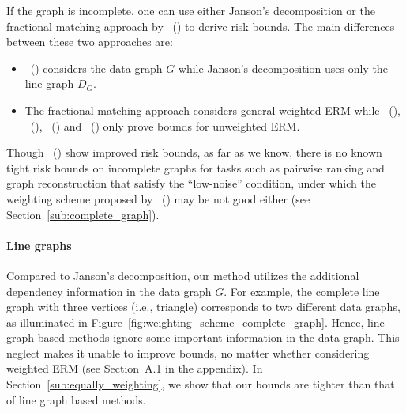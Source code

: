 \documentclass[letterpaper]{article} %
\newcommand{\problemabbr}{\textnormal{C}\textsc{tnd}}
\newcommand{\citet}[1]{\citeauthor{#1}\ (\citeyear{#1})}
\newcommand{\citep}[3]{(#1\ \citeauthor{#3}\ \citeyear{#3},\ #2)}
\begin{document}
If the graph is incomplete, one can use either Janson's decomposition \cite{janson2004large,Usunier2005,ralaivola2009chromatic,DBLP:conf/icml/RalaivolaA15} or the fractional matching approach by \citet{wang2017learning} to derive risk bounds. 
The main differences between these two approaches are: 
\begin{itemize}
  \item \citet{wang2017learning} considers the data graph $G$ while Janson's decomposition uses only the line graph $D_G$. 
  \item The fractional matching approach considers general weighted ERM while \citet{janson2004large}, \citet{Usunier2005}, \citet{ralaivola2009chromatic} and \citet{DBLP:conf/icml/RalaivolaA15} only prove bounds for unweighted ERM.
\end{itemize}
Though \citet{wang2017learning} show improved risk bounds, as far as we know, there is no known tight risk bounds on incomplete graphs for tasks such as pairwise ranking and graph reconstruction that satisfy the ``low-noise'' condition, under which the weighting scheme proposed by \citet{wang2017learning} may be not good either (see Section~\ref{sub:complete_graph}).



\paragraph{Line graphs} 
Compared to Janson's decomposition, our method utilizes the additional dependency information in the data graph $G$. 
For example, the complete line graph with three vertices (i.e., triangle) corresponds to two different data graphs, as illuminated in Figure~\ref{fig:weighting_scheme_complete_graph}.
Hence, line graph based methods ignore some important information in the data graph. 
This neglect makes it unable to improve bounds, no matter whether considering weighted ERM (see Section~A.1 in the appendix). 
In Section~\ref{sub:equally_weighting}, we show that our bounds are tighter than that of line graph based methods. 
\end{document}
